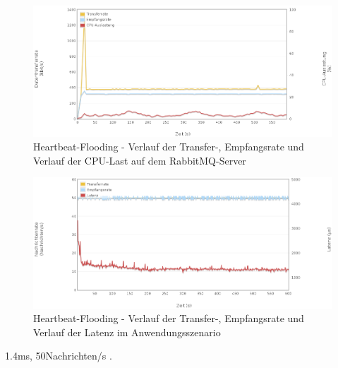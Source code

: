\documentclass[	a4paper,
			11pt,
			oneside,
			parskip]{scrartcl}
\begin{document}
		\begin{figure}[!htb]
			\centering
			\includegraphics[width=\textwidth]{img/heartbeat/heartbeat_server2.png}
			\caption{Heartbeat-Flooding - Verlauf der Transfer-, Empfangsrate und Verlauf der CPU-Last auf dem RabbitMQ-Server}
			\label{fig:heartbeat-server2}
		\end{figure}
		
		\begin{figure}[!htb]
			\centering
			\includegraphics[width=\textwidth]{img/heartbeat/heartbeat_scenario.png}
			\caption{Heartbeat-Flooding - Verlauf der Transfer-, Empfangsrate und Verlauf der Latenz im Anwendungsszenario}
			\label{fig:heartbeat-scenario}
		\end{figure}
	
	
	\clearpage
		{%
		  \newline
		  \newline
		  \newline
		}{%
		 1.4ms, 50Nachrichten/s
		}{%
		. 
		}
		
\end{document}
